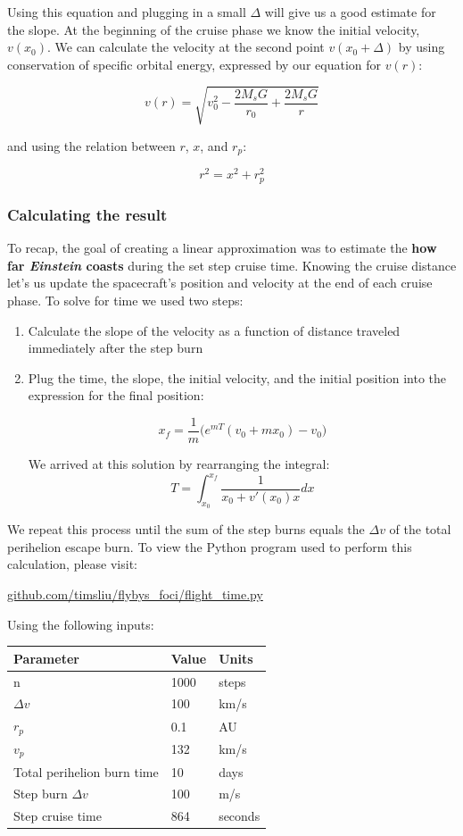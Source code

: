 \documentclass[12pt]{article} %
\begin{document}
Using this equation and plugging in a small $\Delta$ will give us a good estimate for the slope. At the beginning of the cruise phase we know the initial velocity, $v(x_0)$. We can calculate the velocity at the second point $v(x_0 + \Delta)$ by using conservation of specific orbital energy, expressed by our equation for $v(r)$:

$$v(r) = \sqrt{v_0^2-\frac{2M_sG}{r_0} + \frac{2M_sG}{r}}$$

and using the relation between $r$, $x$, and $r_p$:

$$r^2 = x^2 + r_p^2$$


\subsubsection{Calculating the result}
To recap, the goal of creating a linear approximation was to estimate the \textbf{how far \textit{Einstein} coasts} during the set step cruise time. Knowing the cruise distance let's us update the spacecraft's position and velocity at the end of each cruise  phase. To solve for time we used two steps:
\begin{enumerate}
\item Calculate the slope of the velocity as a function of distance traveled immediately after the step burn
\item Plug the time, the slope, the initial velocity, and the initial position into the expression for the final position:

$$\boxed{x_f = \frac{1}{m}\bigg(e^{mT}(v_0+mx_0) - v_0\bigg)}$$

We arrived at this solution by rearranging the integral:
$$\boxed{T = \int_{x_0}^{x_f} \frac{1}{x_0+v'(x_0)x} dx}$$
\end{enumerate}

We repeat this process until the sum of the step burns equals the $\Delta v$ of the total perihelion escape burn. To view the Python program used to perform this calculation, please visit:

\url{github.com/timsliu/flybys_foci/flight_time.py}

Using the following inputs:

\begin{center}
\begin{tabular}{|m{5 cm}| m{5 cm}| m{5 cm}|} \hline
\textbf{Parameter} & \textbf{Value} & \textbf{Units}\\ \hline
n & 1000& steps\\ \hline
$\Delta v$ & 100& km/s \\ \hline
$r_p$      &  0.1& AU\\ \hline
$v_p$     &  132 & km/s\\ \hline
Total perihelion burn time & 10 & days \\ \hline
Step burn $\Delta v$ & 100 & m/s\\ \hline
Step cruise time & 864& seconds \\ \hline
\end{tabular}
\end{center}
\end{document}
